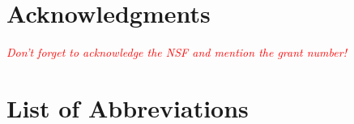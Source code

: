 \documentclass[edeposit,fullpage]{uiucthesis2009}
\newcommand{\red}[1]{\emph{\textcolor{red}{#1}}}
\begin{document}
\chapter*{Acknowledgments}

\red{Don't forget to acknowledge the NSF and mention the grant number!}


\tableofcontents
\listoftables
\listoffigures

\chapter{List of Abbreviations}
\end{document}
